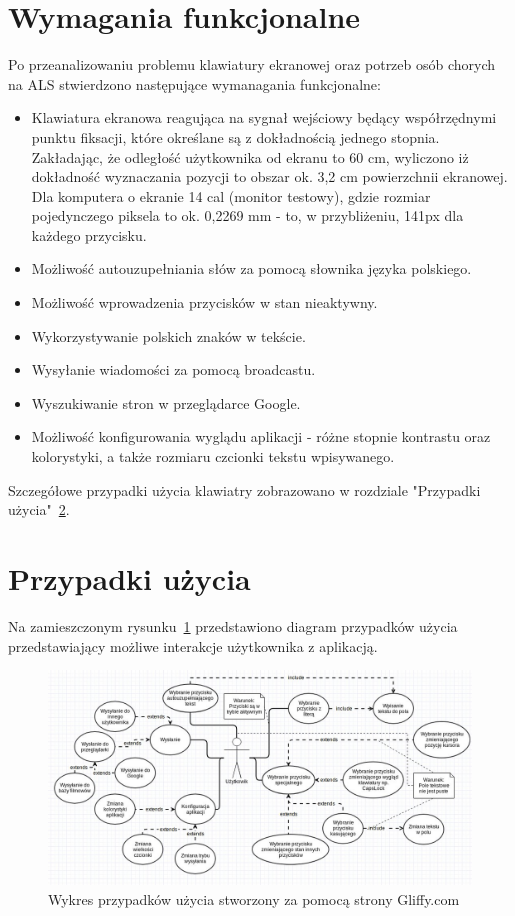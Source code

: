 \documentclass[twoside,a4paper]{book}
\begin{document}
\section{Wymagania funkcjonalne} \label{sec:cele}
Po przeanalizowaniu problemu klawiatury ekranowej oraz potrzeb osób chorych na ALS stwierdzono następujące wymanagania funkcjonalne:
\begin{itemize}
\item Klawiatura ekranowa reagująca na sygnał wejściowy będący współrzędnymi punktu fiksacji, które określane są z dokładnością jednego stopnia. Zakładając, że odległość użytkownika od ekranu to 60 cm, wyliczono iż dokładność wyznaczania pozycji to obszar ok. 3,2 cm powierzchnii ekranowej. Dla komputera o ekranie 14 cal (monitor testowy), gdzie rozmiar pojedynczego piksela to ok. 0,2269 mm - to, w przybliżeniu, 141px dla każdego przycisku. 
\item Możliwość autouzupełniania słów za pomocą słownika języka polskiego.
\item Możliwość wprowadzenia przycisków w stan nieaktywny. 
\item Wykorzystywanie polskich znaków w tekście. 
\item Wysyłanie wiadomości za pomocą broadcastu. 
\item Wyszukiwanie stron w przeglądarce Google.
\item Możliwość konfigurowania wyglądu aplikacji - różne stopnie kontrastu oraz kolorystyki, a także rozmiaru czcionki tekstu wpisywanego. 
\end{itemize}
Szczegółowe przypadki użycia klawiatry zobrazowano w rozdziale "Przypadki użycia"~\ref{sec:uml}.

\section{Przypadki użycia}
  \label{sec:uml}
  Na zamieszczonym rysunku~\ref{fig:useCase} przedstawiono diagram przypadków użycia przedstawiający możliwe interakcje użytkownika z aplikacją. 
\begin{figure}[!h]
		\centering
		\includegraphics[scale=0.4]{img/useCase.jpg}
		\caption{Wykres przypadków użycia stworzony za pomocą strony Gliffy.com}
		\label{fig:useCase}
\end{figure}
\end{document}
